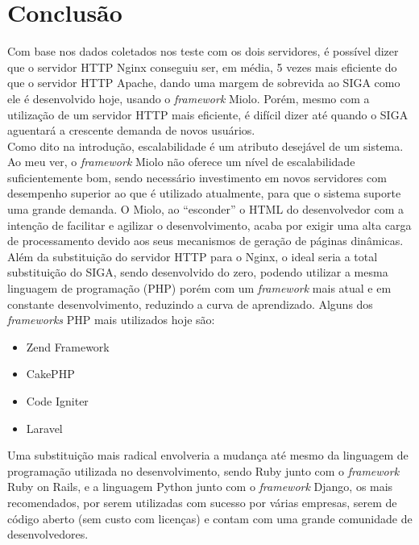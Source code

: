 \chapter{Conclusão}\label{cap:conclusao}
Com base nos dados coletados nos teste com os dois servidores, é possível dizer 
que o servidor HTTP Nginx conseguiu ser, em média, 5 vezes mais eficiente do 
que o servidor HTTP Apache, dando uma margem de sobrevida ao SIGA como ele é 
desenvolvido hoje, usando o \textit{framework} Miolo. Porém, mesmo com a 
utilização de um servidor HTTP mais eficiente, é difícil dizer até quando o 
SIGA aguentará a crescente demanda de novos usuários.\\
Como dito na introdução, escalabilidade é um atributo desejável de um sistema. 
Ao meu ver, o \textit{framework} Miolo não oferece um nível de escalabilidade 
suficientemente bom, sendo necessário investimento em novos servidores com 
desempenho superior ao que é utilizado atualmente, para que o sistema suporte 
uma grande demanda. O Miolo, ao ``esconder'' o HTML do desenvolvedor com a 
intenção de facilitar e agilizar o desenvolvimento, acaba por exigir uma alta 
carga de processamento devido aos seus mecanismos de geração de páginas 
dinâmicas.\\
Além da substituição do servidor HTTP para o Nginx, o ideal seria a total 
substituição do SIGA, sendo desenvolvido do zero, podendo utilizar a mesma 
linguagem de programação (PHP) porém com um \textit{framework} mais atual e em 
constante desenvolvimento, reduzindo a curva de aprendizado. Alguns dos  
\textit{frameworks} PHP mais utilizados hoje são:
\begin{itemize}
	\item Zend Framework
	\item CakePHP
	\item Code Igniter
	\item Laravel
\end{itemize}
Uma substituição mais radical envolveria a mudança até mesmo da linguagem de 
programação utilizada no desenvolvimento, sendo Ruby junto com o 
\textit{framework} Ruby on Rails, e a linguagem Python junto com o 
\textit{framework} Django, os mais recomendados, por serem utilizadas com 
sucesso por várias empresas, serem de código aberto (sem custo com licenças) e 
contam com uma grande comunidade de desenvolvedores.
